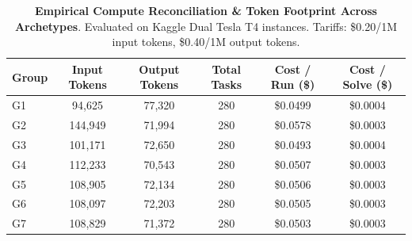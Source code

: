 \begin{table}[h]
\centering
\small
\caption{\textbf{Empirical Compute Reconciliation \& Token Footprint Across Archetypes}. Evaluated on Kaggle Dual Tesla T4 instances. Tariffs: \$0.20/1M input tokens, \$0.40/1M output tokens.}
\label{tab:live_compute_reconciliation}
\begin{tabular}{lccccc}
\toprule
Group & Input Tokens & Output Tokens & Total Tasks & Cost / Run (\$) & Cost / Solve (\$) \\
\midrule
G1 & 94,625 & 77,320 & 280 & \$0.0499 & \$0.0004 \\
G2 & 144,949 & 71,994 & 280 & \$0.0578 & \$0.0003 \\
G3 & 101,171 & 72,650 & 280 & \$0.0493 & \$0.0004 \\
G4 & 112,233 & 70,543 & 280 & \$0.0507 & \$0.0003 \\
G5 & 108,905 & 72,134 & 280 & \$0.0506 & \$0.0003 \\
G6 & 108,097 & 72,203 & 280 & \$0.0505 & \$0.0003 \\
G7 & 108,829 & 71,372 & 280 & \$0.0503 & \$0.0003 \\
\bottomrule
\end{tabular}
\end{table}
